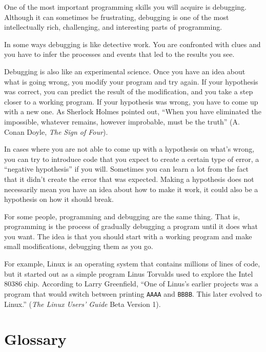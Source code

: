 One of the most important programming skills you will 
acquire is debugging. Although it can sometimes be 
frustrating, debugging is one of the most intellectually 
rich, challenging, and interesting parts of programming.

In some ways debugging is like detective work.  You are confronted
with clues and you have to infer the processes and events that led
to the results you see.

Debugging is also like an experimental science.  Once you have an idea
about what is going wrong, you modify your program and try again.  If
your hypothesis was correct, you can predict the result of the
modification, and you take a step closer to a working program.  If
your hypothesis was wrong, you have to come up with a new one.  As
Sherlock Holmes pointed out, ``When you have eliminated the
impossible, whatever remains, however improbable, must be the truth''
(A. Conan Doyle, {\em The Sign of Four}).

In cases where you are not able to come up with a hypothesis 
on what's wrong, you can try to introduce code that you expect 
to create a certain type of error, a ``negative hypothesis'' 
if you will.  Sometimes you can learn a lot from the fact that 
it didn't create the error that was expected. Making a hypothesis 
does not necessarily mean you have an idea about how to make it 
work, it could also be a hypothesis on how it should break.

For some people, programming and debugging are the same thing.  That
is, programming is the process of gradually debugging a program until
it does what you want.  The idea is that you should start with a
working program and make small modifications,
debugging them as you go.

For example, Linux is an operating system that contains millions of
lines of code, but it started out as a simple program Linus Torvalds
used to explore the Intel 80386 chip.  According to Larry Greenfield,
``One of Linus's earlier projects was a program that would switch
between printing \verb"AAAA" and \verb"BBBB".  This later evolved 
to Linux.'' ({\em The Linux Users' Guide} Beta Version 1).


\section{Glossary}

